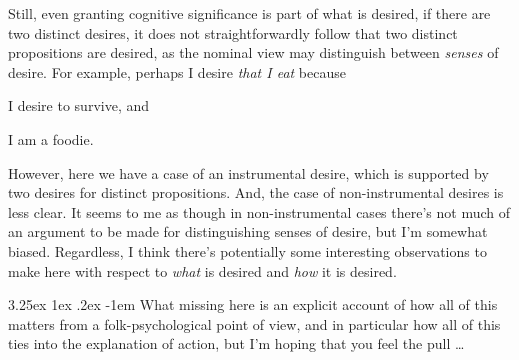 \documentclass[10pt]{article}
\makeatletter
\renewcommand\paragraph{\@startsection{paragraph}{5}{\z@}%
  {3.25ex \@plus1ex \@minus.2ex}%
  {-1em}%
  {\normalfont\normalsize\bfseries}}
\makeatother
\begin{document}
Still, even granting cognitive significance is part of what is desired, if there are two distinct desires, it does not straightforwardly follow that two distinct propositions are desired, as the nominal view may distinguish between \emph{senses} of desire.
For example, perhaps I desire \emph{that I eat} because
\begin{enumerate*}[label=\alph*)]
\item I desire to survive, and
\item I am a foodie.
\end{enumerate*}
However, here we have a case of an instrumental desire, which is supported by two desires for distinct propositions.
And, the case of non-instrumental desires is less clear.
It seems to me as though in non-instrumental cases there's not much of an argument to be made for distinguishing senses of desire, but I'm somewhat biased.
Regardless, I think there's potentially some interesting observations to make here with respect to \emph{what} is desired and \emph{how} it is desired.

\paragraph{ }
What missing here is an explicit account of how all of this matters from a folk-psychological point of view, and in particular how all of this ties into the explanation of action, but I'm hoping that you feel the pull \dots


\end{document}
